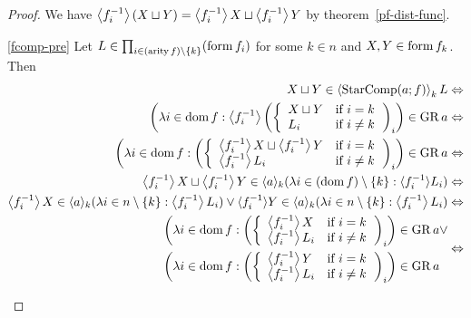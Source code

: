 \begin{proof}
We have $\left\langle f_{i}^{-1}\right\rangle(X\sqcup Y)=\left\langle f_{i}^{-1}\right\rangle X\sqcup\left\langle f_{i}^{-1}\right\rangle Y$
by theorem~\ref{pf-dist-func}.
\begin{widedisorder}
\item [{\ref{fcomp-pre}}] Let $L\in\prod_{i\in(\operatorname{arity} f)\setminus\{k\}}(\operatorname{form} f_{i})$
for some $k\in n$ and $X,Y\in\operatorname{form} f_{k}$. Then 
\begin{eqnarray*}
X\sqcup Y\in\supfun{\StarComp(a;f)}_{k}L & \Leftrightarrow\\
\left(\lambda i\in\dom f:\supfun{f_{i}^{-1}}\left(\left\{ \begin{array}{ll}
X\sqcup Y & \text{if }i=k\\
L_{i} & \text{if }i\neq k
\end{array}\right.\right)_{i}\right)\in\GR a & \Leftrightarrow\\
\left(\lambda i\in\dom f:\left(\left\{ \begin{array}{ll}
\supfun{f_{i}^{-1}}X\sqcup\supfun{f_{i}^{-1}}Y & \text{if }i=k\\
\supfun{f_{i}^{-1}}L_{i} & \text{if }i\neq k
\end{array}\right.\right)_{i}\right)\in\GR a & \Leftrightarrow\\
\supfun{f_{i}^{-1}}X\sqcup\supfun{f_{i}^{-1}}Y\in\langle a\rangle_{k}(\lambda i\in(\dom f)\setminus\{k\}:\langle f_{i}^{-1}\rangle L_{i}) & \Leftrightarrow\\
\supfun{f_{i}^{-1}}X\in\langle a\rangle_{k}(\lambda i\in n\setminus\{k\}:\supfun{f_{i}^{-1}}L_{i})\vee\langle f_{i}^{-1}\rangle Y\in\langle a\rangle_{k}(\lambda i\in n\setminus\{k\}:\supfun{f_{i}^{-1}}L_{i}) & \Leftrightarrow\\
\begin{aligned}\left(\lambda i\in\dom f:\left(\left\{ \begin{array}{ll}
\supfun{f_{i}^{-1}}X & \text{if }i=k\\
\supfun{f_{i}^{-1}}L_{i} & \text{if }i\neq k
\end{array}\right.\right)_{i}\right)\in\GR a & \vee\\
\left(\lambda i\in\dom f:\left(\left\{ \begin{array}{ll}
\supfun{f_{i}^{-1}}Y & \text{if }i=k\\
\supfun{f_{i}^{-1}}L_{i} & \text{if }i\neq k
\end{array}\right.\right)_{i}\right)\in\GR a
\end{aligned}
 & \Leftrightarrow\\

\end{eqnarray*}
\end{widedisorder}
\end{proof}
